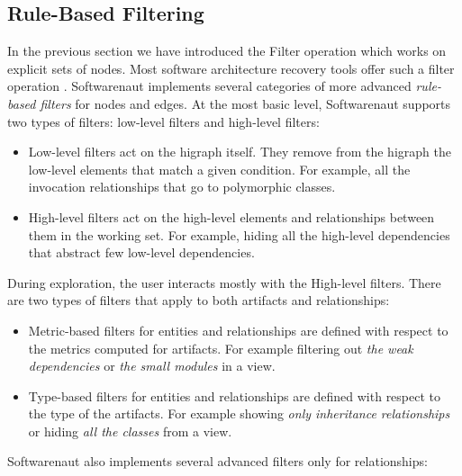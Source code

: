 \documentclass[preprint,12pt]{elsarticle}
\begin{document}
\newpage
\subsection {Rule-Based Filtering}

In the previous section we have introduced the Filter operation which works on explicit sets of nodes. Most software architecture recovery tools offer such a filter operation \cite{aracic-filtering}. Softwarenaut implements several categories of more advanced {\em rule-based filters} for nodes and edges. At the most basic level, Softwarenaut supports two types of filters: low-level filters and high-level filters:

\begin{itemize}

\item Low-level filters act on the higraph itself. They remove from the higraph the low-level elements that match a given condition. For example, all the invocation relationships that go to polymorphic classes.

\item High-level filters act on the high-level elements and relationships between them in the working set. For example, hiding all the high-level dependencies that abstract few low-level dependencies.
\end{itemize}

During exploration, the user interacts mostly with the High-level filters. There are two types of filters that apply to both artifacts and relationships: 

\begin{itemize}
\item Metric-based filters for entities and relationships are defined with respect to the metrics computed for artifacts. For example filtering out {\em the weak dependencies} or {\em the small modules} in a view.
\item Type-based filters for entities and relationships are defined with respect to the type of the artifacts. For example showing {\em only inheritance relationships} or hiding {\em all the classes} from a view.
\end{itemize}

Softwarenaut also implements several advanced filters only for relationships:
\end{document}
